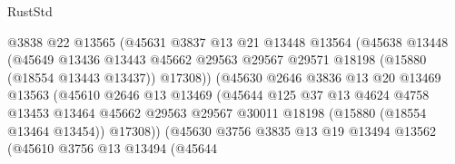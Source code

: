 \begin{lexlean}{RustStd}
\begin{coremodule}
                                @3838
                                @22
                                @13565
                                (@45631
                                  @3837
                                  @13
                                  @21
                                  @13448
                                  @13564
                                  (@45638
                                    @13448
                                    (@45649
                                      @13436
                                      @13443
                                      @45662
                                      @29563
                                      @29567
                                      @29571
                                      @18198
                                      (@15880 (@18554 @13443 @13437))
                                      @17308))
                                  (@45630
                                    @2646
                                    @3836
                                    @13
                                    @20
                                    @13469
                                    @13563
                                    (@45610
                                      @2646
                                      @13
                                      @13469
                                      (@45644
                                        @125
                                        @37
                                        @13
                                        @4624
                                        @4758
                                        @13453
                                        @13464
                                        @45662
                                        @29563
                                        @29567
                                        @30011
                                        @18198
                                        (@15880 (@18554 @13464 @13454))
                                        @17308))
                                    (@45630
                                      @3756
                                      @3835
                                      @13
                                      @19
                                      @13494
                                      @13562
                                      (@45610
                                        @3756
                                        @13
                                        @13494
                                        (@45644

\end{coremodule}
\end{lexlean}
